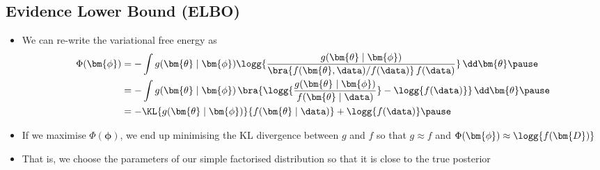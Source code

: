 \begin{slide}
\section{Evidence Lower Bound (ELBO)}

\begin{PauseHighLight}
  \begin{itemize}
  \item We can re-write the variational free energy as
    \begin{align*}
      \Phi(\bm{\phi}) &= -\int g(\bm{\theta}\mid\bm{\phi})
      \logg{\frac{g(\bm{\theta}\mid\bm{\phi})}{\bra{f(\bm{\theta},
                          \data)/f(\data)} \, f(\data)}} \,  \dd \bm{\theta}\pause
      \\
      &=  -\int g(\bm{\theta}\mid\bm{\phi}) \, \bra{
      \logg{\frac{g(\bm{\theta}\mid\bm{\phi})}{f(\bm{\theta}
                          \mid\data)} } - \logg{f(\data)} }\, \dd
        \bm{\theta}\pause
        \\
                        &= -\KL{g(\bm{\theta}\mid\bm{\phi})}{f(\bm{\theta}\mid \data)}
                           + \logg{f(\data)}\pause
    \end{align*}
    \item If we maximise $\Phi(\bm{\phi})$, we end up minimising the KL
      divergence between $g$ and $f$ so that $g\approx f$ and
      $\Phi(\bm{\phi})\approx \logg{f(\bm{D})}$\pause
    \item That is, we choose the parameters of our simple  factorised
      distribution so that it is close to the true posterior\pause
  \end{itemize}
\end{PauseHighLight}

\end{slide}


